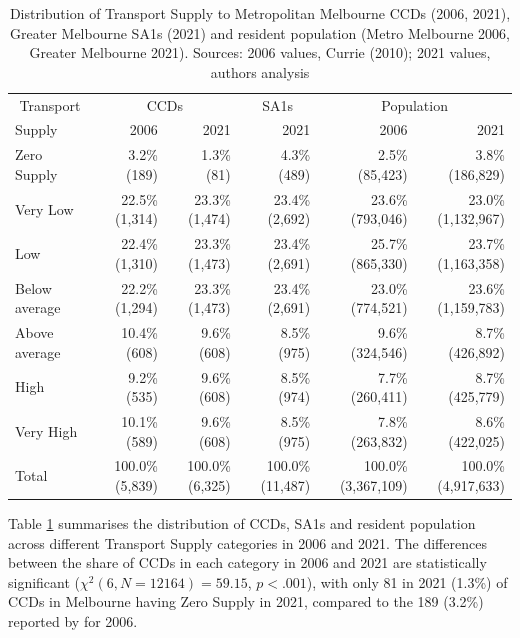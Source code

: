 \documentclass[preprint, 3p,
authoryear]{elsarticle} %
\begin{document}
\begin{table}

\caption{\label{tab:Greater_Melbourne_SA1_2021_table}Distribution of Transport Supply to Metropolitan Melbourne CCDs (2006, 2021),  Greater Melbourne SA1s (2021) and resident population (Metro Melbourne 2006, Greater Melbourne 2021). Sources: 2006 values, Currie (2010); 2021 values, authors analysis}
\centering
\begin{tabular}[t]{l|r|r|r|r|r}
\hline
\multicolumn{1}{c|}{Transport} & \multicolumn{2}{c|}{CCDs} & \multicolumn{1}{c|}{SA1s} & \multicolumn{2}{c}{Population} \\
\cline{1-1} \cline{2-3} \cline{4-4} \cline{5-6}
Supply & 2006 & 2021 & 2021 & 2006 & 2021\\
\hline
Zero Supply & 3.2\%   (189) & 1.3\%    (81) & 4.3\%    (489) & 2.5\%    (85,423) & 3.8\%   (186,829)\\
\hline
Very Low & 22.5\% (1,314) & 23.3\% (1,474) & 23.4\%  (2,692) & 23.6\%   (793,046) & 23.0\% (1,132,967)\\
\hline
Low & 22.4\% (1,310) & 23.3\% (1,473) & 23.4\%  (2,691) & 25.7\%   (865,330) & 23.7\% (1,163,358)\\
\hline
Below average & 22.2\% (1,294) & 23.3\% (1,473) & 23.4\%  (2,691) & 23.0\%   (774,521) & 23.6\% (1,159,783)\\
\hline
Above average & 10.4\%   (608) & 9.6\%   (608) & 8.5\%    (975) & 9.6\%   (324,546) & 8.7\%   (426,892)\\
\hline
High & 9.2\%   (535) & 9.6\%   (608) & 8.5\%    (974) & 7.7\%   (260,411) & 8.7\%   (425,779)\\
\hline
Very High & 10.1\%   (589) & 9.6\%   (608) & 8.5\%    (975) & 7.8\%   (263,832) & 8.6\%   (422,025)\\
\hline
Total & 100.0\% (5,839) & 100.0\% (6,325) & 100.0\% (11,487) & 100.0\% (3,367,109) & 100.0\% (4,917,633)\\
\hline
\end{tabular}
\end{table}

Table \ref{tab:Greater_Melbourne_SA1_2021_table} summarises the
distribution of CCDs, SA1s and resident population across different
Transport Supply categories in 2006 and 2021. The differences between
the share of CCDs in each category in 2006 and 2021 are statistically
significant (\(\chi^2(6, N = 12164) = 59.15\), \(p < .001\)), with only
81 in 2021 (1.3\%) of CCDs in Melbourne having Zero Supply in 2021,
compared to the 189 (3.2\%) reported by \citet{currie2010identifying}
for 2006.
\end{document}
